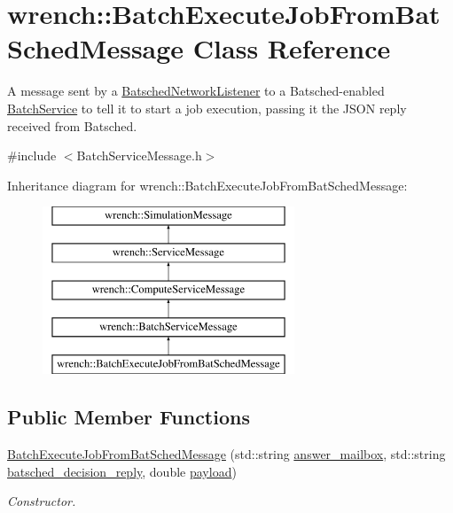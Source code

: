 \hypertarget{classwrench_1_1_batch_execute_job_from_bat_sched_message}{}\section{wrench\+:\+:Batch\+Execute\+Job\+From\+Bat\+Sched\+Message Class Reference}
\label{classwrench_1_1_batch_execute_job_from_bat_sched_message}


A message sent by a \hyperlink{classwrench_1_1_batsched_network_listener}{Batsched\+Network\+Listener} to a Batsched-\/enabled \hyperlink{classwrench_1_1_batch_service}{Batch\+Service} to tell it to start a job execution, passing it the J\+S\+ON reply received from Batsched.  




{\ttfamily \#include $<$Batch\+Service\+Message.\+h$>$}

Inheritance diagram for wrench\+:\+:Batch\+Execute\+Job\+From\+Bat\+Sched\+Message\+:\begin{figure}[H]
\begin{center}
\leavevmode
\includegraphics[height=5.000000cm]{classwrench_1_1_batch_execute_job_from_bat_sched_message}
\end{center}
\end{figure}
\subsection*{Public Member Functions}
\begin{DoxyCompactItemize}
\item 
\hyperlink{classwrench_1_1_batch_execute_job_from_bat_sched_message_ac239c71112b1d05c5c2a5aabfcfb58b1}{Batch\+Execute\+Job\+From\+Bat\+Sched\+Message} (std\+::string \hyperlink{classwrench_1_1_batch_execute_job_from_bat_sched_message_a52482536e42f7d63830eec2afa8e1e48}{answer\+\_\+mailbox}, std\+::string \hyperlink{classwrench_1_1_batch_execute_job_from_bat_sched_message_a580ba37a834ee4e408f6e045314362e4}{batsched\+\_\+decision\+\_\+reply}, double \hyperlink{classwrench_1_1_simulation_message_a914f2732713f7c02898e66f05a7cb8a1}{payload})
\begin{DoxyCompactList}\small\item\em Constructor. \end{DoxyCompactList}\end{DoxyCompactItemize}
